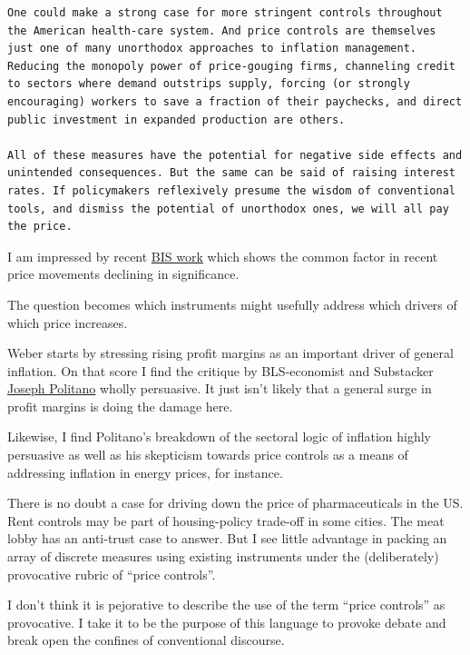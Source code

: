 \documentclass[
]{book}
\begin{document}
\begin{verbatim}
One could make a strong case for more stringent controls throughout the American health-care system. And price controls are themselves just one of many unorthodox approaches to inflation management. Reducing the monopoly power of price-gouging firms, channeling credit to sectors where demand outstrips supply, forcing (or strongly encouraging) workers to save a fraction of their paychecks, and direct public investment in expanded production are others.

All of these measures have the potential for negative side effects and unintended consequences. But the same can be said of raising interest rates. If policymakers reflexively presume the wisdom of conventional tools, and dismiss the potential of unorthodox ones, we will all pay the price.
\end{verbatim}

I am impressed by recent \href{https://www.bis.org/publ/qtrpdf/r_qt2109b.htm}{BIS work} which shows the common factor in recent price movements declining in significance.

The question becomes which instruments might usefully address which drivers of which price increases.

Weber starts by stressing rising profit margins as an important driver of general inflation. On that score I find the critique by BLS-economist and Substacker \href{https://apricitas.substack.com/p/are-rising-corporate-profit-margins}{Joseph Politano} wholly persuasive. It just isn't likely that a general surge in profit margins is doing the damage here.

Likewise, I find Politano's breakdown of the sectoral logic of inflation highly persuasive as well as his skepticism towards price controls as a means of addressing inflation in energy prices, for instance.

There is no doubt a case for driving down the price of pharmaceuticals in the US. Rent controls may be part of housing-policy trade-off in some cities. The meat lobby has an anti-trust case to answer. But I see little advantage in packing an array of discrete measures using existing instruments under the (deliberately) provocative rubric of ``price controls''.

I don't think it is pejorative to describe the use of the term ``price controls'' as provocative. I take it to be the purpose of this language to provoke debate and break open the confines of conventional discourse.
\end{document}
